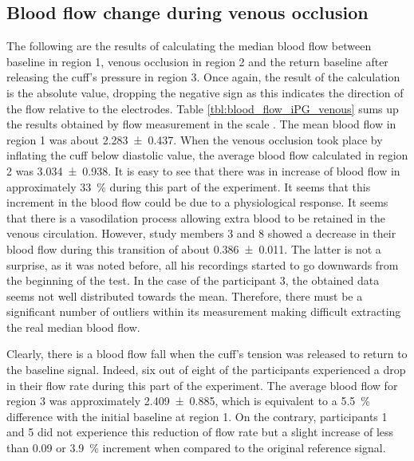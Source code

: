 \subsection{Blood flow change during venous occlusion}
\label{sectio results 3.1}
The following are the results of calculating the median blood flow between baseline in region 1, venous occlusion in region 2 and the return baseline after releasing the cuff's pressure in region 3. Once again, the result of the calculation is the absolute value, dropping the negative sign as this indicates the direction of the flow relative to the electrodes. Table \ref{tbl:blood_flow_iPG_venous} sums up the results obtained by flow measurement in the scale \si{\bfv}. The mean blood flow in region 1 was about \SI{2.283(0437)}{\bfv}. When the venous occlusion took place by inflating the cuff below diastolic value, the average blood flow calculated in region 2 was \SI{3.034(0938)}{\bfv}. It is easy to see that there was in increase of blood flow in approximately \SI{33}{\percent} during this part of the experiment. It seems that this increment in the blood flow could be due to a physiological response. It seems that there is a vasodilation process allowing extra blood to be retained in the venous circulation. However, study members 3 and 8 showed a decrease in their blood flow during this transition of about \SI{0.386(0011)}{\bfv}. The latter is not a surprise, as it was noted before, all his recordings started to go downwards from the beginning of the test. In the case of the participant 3, the obtained data seems not well distributed towards the mean. Therefore, there must be a significant number of outliers within its measurement making difficult extracting the real median blood flow. 

Clearly, there is a blood flow fall when the cuff's tension was released to return to the baseline signal. Indeed, six out of eight of the participants experienced a drop in their flow rate during this part of the experiment. The average blood flow for region 3 was approximately \SI{2.409(0885)}{\bfv}, which is equivalent to a \SI{5.5}{\percent} difference with the initial baseline at region 1. On the contrary, participants 1 and 5 did not experience this reduction of flow rate but a slight increase of less than \SI{0.09}{\bfv} or \SI{3.9}{\percent} increment when compared to the original reference signal.

